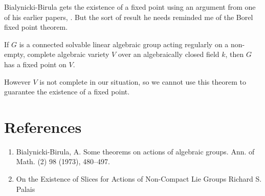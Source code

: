 \documentclass[12pt]{article}
\begin{document}
\begin{remark}
   Bialynicki-Birula gets the existence of a fixed point using an argument from one of his earlier papers, . But the sort of result he needs reminded me of the Borel fixed point theorem.
\begin{adjustwidth}{2em}{0pt}
   \vspace{-\parskip} %
   \vspace{-16pt}
\begin{theorem}
If $G$ is a connected solvable linear algebraic group acting regularly on a non-empty, complete algebraic variety $V$ over an algebraically closed field $k$, then $G$ has a fixed point on $V$.
\end{theorem}
\end{adjustwidth}
However $V$ is not complete in our situation, so we cannot use this theorem to guarantee the existence of a fixed point.
\end{remark}

\section{References}
\begin{enumerate}
    \item Bialynicki-Birula, A. Some theorems on actions of algebraic groups. Ann. of Math. (2) 98 (1973), 480–497.
    \item On the Existence of Slices for Actions of Non-Compact Lie Groups Richard S. Palais
\end{enumerate}
\end{document}
